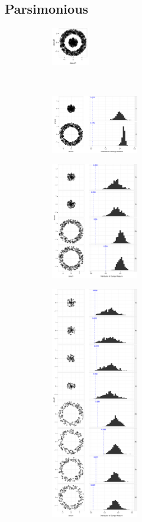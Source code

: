 \subsection{Parsimonious}
  \begin{figure}
    \centering
    \begin{minipage}[b]{1.5in}
       \begin{subfigure}[b]{\linewidth}
  	\includegraphics[width=0.65in]{images/donut1-donut2.pdf}
      \caption{}
      \label{fig:pars1}
      \end{subfigure}\\[\baselineskip]
      \begin{subfigure}[b]{\linewidth}
  	\includegraphics[width=1.5in]{images/19_7340782313668-cluster.pdf}
      \caption{}
      \label{fig:pars2}
      \end{subfigure}
      \begin{subfigure}[b]{\linewidth}
  	\includegraphics[width=1.5in]{images/8_12377386346542-cluster1.pdf}
        \caption{}
      \label{fig:pars3}        
      \end{subfigure}
    \end{minipage}
    \begin{subfigure}[b]{1.5in}
	\includegraphics[width=1.5in]{images/5_54820204216055-cluster2.pdf}

\end{subfigure}
\end{figure}
